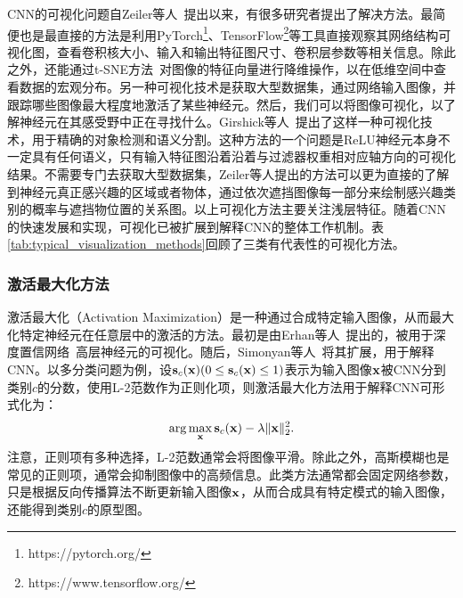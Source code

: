 CNN的可视化问题自Zeiler等人~\cite{zeiler2014visualizing}提出以来，有很多研究者提出了解决方法。最简便也是最直接的方法是利用PyTorch\footnote{https://pytorch.org/}、TensorFlow\footnote{https://www.tensorflow.org/}等工具直接观察其网络结构可视化图，查看卷积核大小、输入和输出特征图尺寸、卷积层参数等相关信息。除此之外，还能通过t-SNE方法~\cite{maaten2008visualizing}对图像的特征向量进行降维操作，以在低维空间中查看数据的宏观分布。另一种可视化技术是获取大型数据集，通过网络输入图像，并跟踪哪些图像最大程度地激活了某些神经元。然后，我们可以将图像可视化，以了解神经元在其感受野中正在寻找什么。Girshick等人~\cite{girshick2014rich}提出了这样一种可视化技术，用于精确的对象检测和语义分割。这种方法的一个问题是ReLU神经元本身不一定具有任何语义，只有输入特征图沿着沿着与过滤器权重相对应轴方向的可视化结果。不需要专门去获取大型数据集，Zeiler等人提出的方法可以更为直接的了解到神经元真正感兴趣的区域或者物体，通过依次遮挡图像每一部分来绘制感兴趣类别的概率与遮挡物位置的关系图。以上可视化方法主要关注浅层特征。随着CNN的快速发展和实现，可视化已被扩展到解释CNN的整体工作机制。表\ref{tab:typical_visualization_methods}回顾了三类有代表性的可视化方法。
\subsubsection{激活最大化方法}
激活最大化（Activation Maximization）是一种通过合成特定输入图像，从而最大化特定神经元在任意层中的激活的方法。最初是由Erhan等人~\cite{erhan2009visualizing}提出的，被用于深度置信网络~\cite{hinton2006fast}高层神经元的可视化。随后，Simonyan等人~\cite{simonyan2013deep}将其扩展，用于解释CNN。以多分类问题为例，设$\mathbf{s}_{c}(\mathbf{x})(0\leq \mathbf{s}_{c}(\mathbf{x}) \leq 1)$表示为输入图像$\mathbf{x}$被CNN分到类别$c$的分数，使用L-2范数作为正则化项，则激活最大化方法用于解释CNN可形式化为：
\begin{equation*}
\arg \max _{\mathbf{x}} {\mathbf{s}}_{c}(\mathbf{x})-\lambda\|\mathbf{x}\|_{2}^{2}.
\end{equation*}
注意，正则项有多种选择，L-2范数通常会将图像平滑。除此之外，高斯模糊也是常见的正则项，通常会抑制图像中的高频信息。此类方法通常都会固定网络参数，只是根据反向传播算法不断更新输入图像$\mathbf{x}$，从而合成具有特定模式的输入图像，还能得到类别$c$的原型图。


